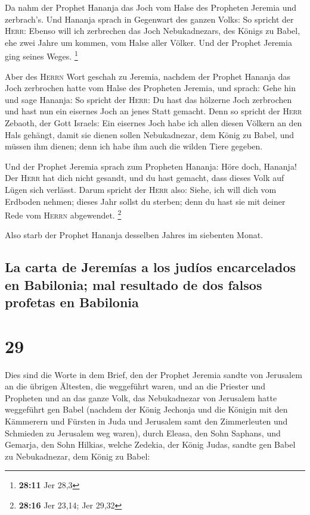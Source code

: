  Da nahm der Prophet Hananja das Joch vom Halse des
Propheten Jeremia und zerbrach's.  Und Hananja sprach in
Gegenwart des ganzen Volks: So spricht der \textsc{Herr}: Ebenso will
ich zerbrechen das Joch Nebukadnezars, des Königs zu Babel, ehe zwei
Jahre um kommen, vom Halse aller Völker. Und der Prophet Jeremia ging
seines Weges. \footnote{\textbf{28:11} Jer 28,3}

 Aber des \textsc{Herrn} Wort geschah zu Jeremia, nachdem
der Prophet Hananja das Joch zerbrochen hatte vom Halse des Propheten
Jeremia, und sprach:  Gehe hin und sage Hananja: So
spricht der \textsc{Herr}: Du hast das hölzerne Joch zerbrochen und hast
nun ein eisernes Joch an jenes Statt gemacht.  Denn so
spricht der \textsc{Herr} Zebaoth, der Gott Israels: Ein eisernes Joch
habe ich allen diesen Völkern an den Hals gehängt, damit sie dienen
sollen Nebukadnezar, dem König zu Babel, und müssen ihm dienen; denn ich
habe ihm auch die wilden Tiere gegeben.

 Und der Prophet Jeremia sprach zum Propheten Hananja:
Höre doch, Hananja! Der \textsc{Herr} hat dich nicht gesandt, und du
hast gemacht, dass dieses Volk auf Lügen sich verlässt. 
Darum spricht der \textsc{Herr} also: Siehe, ich will dich vom Erdboden
nehmen; dieses Jahr sollst du sterben; denn du hast sie mit deiner Rede
vom \textsc{Herrn} abgewendet. \footnote{\textbf{28:16} Jer 23,14; Jer
  29,32}

 Also starb der Prophet Hananja desselben Jahres im
siebenten Monat.

\hypertarget{la-carta-de-jeremuxedas-a-los-juduxedos-encarcelados-en-babilonia-mal-resultado-de-dos-falsos-profetas-en-babilonia}{%
\subsection{La carta de Jeremías a los judíos encarcelados en Babilonia;
mal resultado de dos falsos profetas en
Babilonia}\label{la-carta-de-jeremuxedas-a-los-juduxedos-encarcelados-en-babilonia-mal-resultado-de-dos-falsos-profetas-en-babilonia}}

\hypertarget{section-28}{%
\section{29}\label{section-28}}

 Dies sind die Worte in dem Brief, den der Prophet Jeremia
sandte von Jerusalem an die übrigen Ältesten, die weggeführt waren, und
an die Priester und Propheten und an das ganze Volk, das Nebukadnezar
von Jerusalem hatte weggeführt gen Babel  (nachdem der
König Jechonja und die Königin mit den Kämmerern und Fürsten in Juda und
Jerusalem samt den Zimmerleuten und Schmieden zu Jerusalem weg waren),
 durch Eleasa, den Sohn Saphans, und Gemarja, den Sohn
Hilkias, welche Zedekia, der König Judas, sandte gen Babel zu
Nebukadnezar, dem König zu Babel:

